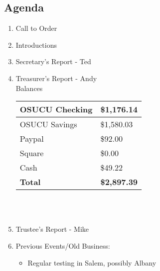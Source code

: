 \documentclass[letter,11pt]{extarticle}
\begin{document}
	\subsection*{Agenda}
	\begin{enumerate}
		\item Call to Order
		\item Introductions
		\item Secretary's Report - Ted
		\item Treasurer's Report - Andy \\
				Balances 
			\begin{tabular}{|l|l|} \hline
				OSUCU Checking & \$1,176.14 \\ \hline
				OSUCU Savings & \$1,580.03 \\ \hline
				Paypal & \$92.00 \\ \hline
				Square & \$0.00 \\ \hline
				Cash & \$49.22 \\ \hline
				\textbf{Total} & \textbf{\$2,897.39} \\ \hline
			\end{tabular} \\ \\
		\item Trustee's Report - Mike
		\item Previous Events/Old Business:
		\begin{itemize}
			\item Regular testing in Salem, possibly Albany
		\end{itemize}
			

\end{enumerate}
\end{document}
